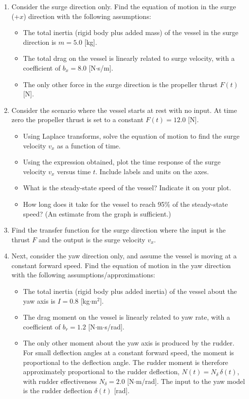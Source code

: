 \documentclass[11pt]{article}
\begin{document}
\begin{enumerate}[resume]

\item Consider the surge direction only.  Find the equation of motion in the surge (+$x$) direction with the following assumptions:
  \begin{itemize}[nosep]
    \item The total inertia (rigid body plus added mass) of the vessel in the surge direction is $m = 5.0$ [kg].
    \item The total drag on the vessel is linearly related to surge velocity, with a coefficient of $b_x = 8.0$ [N$\cdot$s/m].
    \item The only other force in the surge direction is the propeller thrust $F(t)$ [N].
  \end{itemize}

\item Consider the scenario where the vessel starts at rest with no input.  At time zero the propeller thrust is set to a constant $F(t) = 12.0$ [N].
  \begin{itemize}[nosep]
    \item Using Laplace transforms, solve the equation of motion to find the surge velocity $v_x$ as a function of time.
    \item Using the expression obtained, plot the time response of the surge velocity $v_x$ versus time $t$.  Include labels and units on the axes.
    \item What is the steady-state speed of the vessel?  Indicate it on your plot.
    \item How long does it take for the vessel to reach 95\% of the steady-state speed?  (An estimate from the graph is sufficient.)
  \end{itemize}

\item Find the transfer function for the surge direction where the input is the thrust $F$ and the output is the surge velocity $v_x$.

\item Next, consider the yaw direction only, and assume the vessel is moving at a constant forward speed.  Find the equation of motion in the yaw direction with the following assumptions/approximations:
  \begin{itemize}[nosep]
    \item The total inertia (rigid body plus added inertia) of the vessel about the yaw axis is $I = 0.8$ [kg$\cdot$m$^2$].
    \item The drag moment on the vessel is linearly related to yaw rate, with a coefficient of $b_r = 1.2$ [N$\cdot$m$\cdot$s/rad].
    \item The only other moment about the yaw axis is produced by the rudder.  For small deflection angles at a constant forward speed, the moment is proportional to the deflection angle.  The rudder moment is therefore approximately proportional to the rudder deflection, $N(t) = N_\delta\,\delta(t)$, with rudder effectiveness $N_\delta = 2.0$ [N$\cdot$m/rad].  The input to the yaw model is the rudder deflection $\delta(t)$ [rad].
  \end{itemize}


\end{enumerate}
\end{document}
